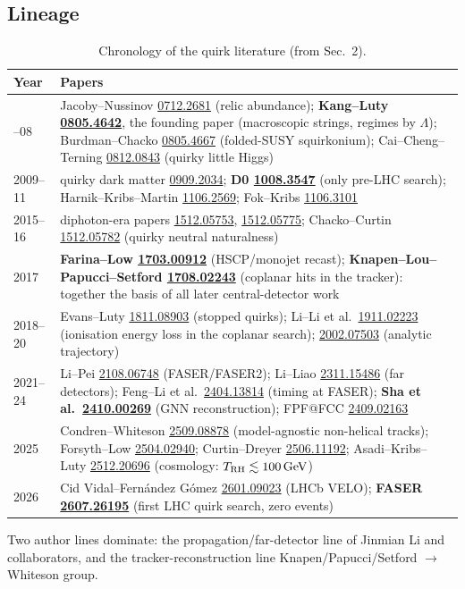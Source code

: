 \documentclass[11pt,a4paper]{article}
\newcommand{\ax}[1]{\href{https://arxiv.org/abs/#1}{#1}}
\DeclareRobustCommand{\file}[1]{\path{#1}}
\newcommand{\GeV}{\,\mathrm{GeV}}
\begin{document}
\subsection{Lineage}
{\small
\begin{longtable}{@{}L{1.65cm}L{15.02cm}@{}}
\caption{Chronology of the quirk literature (from \file{literature_map.md} Sec.~2).}\label{tab:lineage}\\
\toprule Year & Papers\\\midrule\endfirsthead
\bottomrule{}--08 & Jacoby--Nussinov \ax{0712.2681} (relic abundance); \textbf{Kang--Luty \ax{0805.4642}}, the founding paper (macroscopic strings, regimes by $\Lambda$); Burdman--Chacko \ax{0805.4667} (folded-SUSY squirkonium); Cai--Cheng--Terning \ax{0812.0843} (quirky little Higgs)\\
2009--11 & quirky dark matter \ax{0909.2034}; \textbf{D0 \ax{1008.3547}} (only pre-LHC search); Harnik--Kribs--Martin \ax{1106.2569}; Fok--Kribs \ax{1106.3101}\\
2015--16 & diphoton-era papers \ax{1512.05753}, \ax{1512.05775}; Chacko--Curtin \ax{1512.05782} (quirky neutral naturalness)\\
2017 & \textbf{Farina--Low \ax{1703.00912}} (HSCP/monojet recast); \textbf{Knapen--Lou--Papucci--Setford \ax{1708.02243}} (coplanar hits in the tracker): together the basis of all later central-detector work\\
2018--20 & Evans--Luty \ax{1811.08903} (stopped quirks); Li--Li et al.\ \ax{1911.02223} (ionisation energy loss in the coplanar search); \ax{2002.07503} (analytic trajectory)\\
2021--24 & Li--Pei \ax{2108.06748} (FASER/FASER2); Li--Liao \ax{2311.15486} (far detectors); Feng--Li et al.\ \ax{2404.13814} (timing at FASER); \textbf{Sha et al.\ \ax{2410.00269}} (GNN reconstruction); FPF@FCC \ax{2409.02163}\\
2025 & Condren--Whiteson \ax{2509.08878} (model-agnostic non-helical tracks); Forsyth--Low \ax{2504.02940}; Curtin--Dreyer \ax{2506.11192}; Asadi--Kribs--Luty \ax{2512.20696} (cosmology: $T_{\rm RH}\lesssim100\GeV$)\\
2026 & Cid Vidal--Fern\'andez G\'omez \ax{2601.09023} (LHCb VELO); \textbf{FASER \ax{2607.26195}} (first LHC quirk search, zero events)\\
\end{longtable}
}
Two author lines dominate: the propagation/far-detector line of Jinmian Li and collaborators, and the tracker-reconstruction line Knapen/Papucci/Setford $\to$ Whiteson group.
\end{document}
